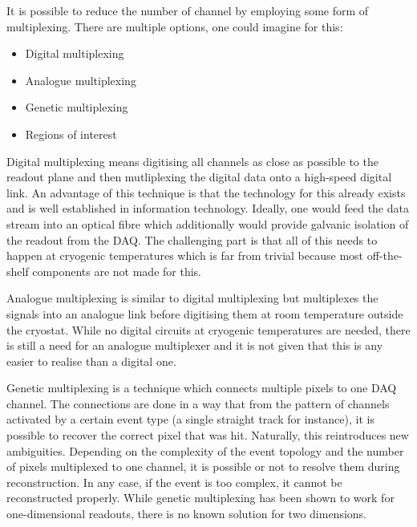 It is possible to reduce the number of channel by employing some form of multiplexing.
There are multiple options, one could imagine for this:
\begin{itemize}
	\item Digital multiplexing
	\item Analogue multiplexing
	\item Genetic multiplexing
	\item Regions of interest
\end{itemize}

Digital multiplexing means digitising all channels as close as possible to the readout plane and then mutliplexing the digital data onto a high-speed digital link.
An advantage of this technique is that the technology for this already exists and is well established in information technology.
Ideally, one would feed the data stream into an optical fibre which additionally would provide galvanic isolation of the readout from the DAQ.
The challenging part is that all of this needs to happen at cryogenic temperatures which is far from trivial because most off-the-shelf components are not made for this.

Analogue multiplexing is similar to digital multiplexing but multiplexes the signals into an analogue link before digitising them at room temperature outside the cryostat.
While no digital circuits at cryogenic temperatures are needed, there is still a need for an analogue multiplexer and it is not given that this is any easier to realise than a digital one.

Genetic multiplexing is a technique which connects multiple pixels to one DAQ channel.
The connections are done in a way that from the pattern of channels activated by a certain event type (a single straight track for instance), it is possible to recover the correct pixel that was hit.
Naturally, this reintroduces new ambiguities.
Depending on the complexity of the event topology and the number of pixels multiplexed to one channel, it is possible or not to resolve them during reconstruction.
In any case, if the event is too complex, it cannot be reconstructed properly.
While genetic multiplexing has been shown to work for one-dimensional readouts, there is no known solution for two dimensions.

